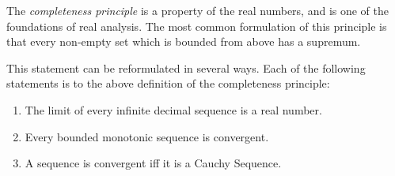 \documentclass{article}
\begin{document}
The \emph{completeness principle} is a property of the real numbers, and is one of the foundations of real analysis. The most common formulation of this principle is that every non-empty set which is bounded from above has a supremum.

This statement can be reformulated in several ways.  Each of the following statements is  to the above definition of the completeness principle:
\begin{enumerate}
\item The limit of every infinite decimal sequence is a real number.
\item Every bounded monotonic sequence is convergent.
\item A sequence is convergent iff it is a Cauchy Sequence.
\end{enumerate}
\end{document}
